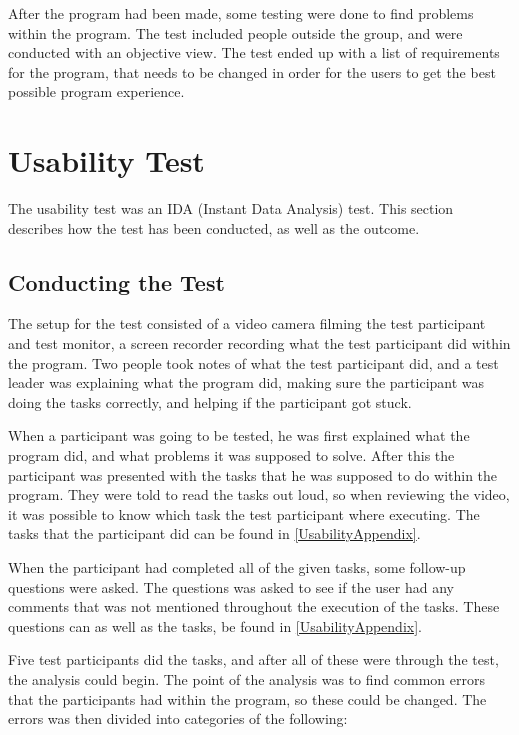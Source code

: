 After the program had been made, some testing were done to find problems within the program. The test included people outside the group, and were conducted with an objective view. The test ended up with a list of requirements for the program, that needs to be changed in order for the users to get the best possible program experience.

\section{Usability Test}\label{UsabilityTestSection}
The usability test was an IDA (Instant Data Analysis) test. This section describes how the test has been conducted, as well as the outcome.

\subsection{Conducting the Test}

The setup for the test consisted of a video camera filming the test participant and test monitor, a screen recorder recording what the test participant did within the program. Two people took notes of what the test participant did, and a test leader was explaining what the program did, making sure the participant was doing the tasks correctly, and helping if the participant got stuck.

When a participant was going to be tested, he was first explained what the program did, and what problems it was supposed to solve. After this the participant was presented with the tasks that he was supposed to do within the program. They were told to read the tasks out loud, so when reviewing the video, it was possible to know which task the test participant where executing. The tasks that the participant did can be found in \cref{UsabilityAppendix}.

When the participant had completed all of the given tasks, some follow-up questions were asked. The questions was asked to see if the user had any comments that was not mentioned throughout the execution of the tasks. These questions can as well as the tasks, be found in \cref{UsabilityAppendix}.

Five test participants did the tasks, and after all of these were through the test, the analysis could begin. The point of the analysis was to find common errors that the participants had within the program, so these could be changed. The errors was then divided into categories of the following:

